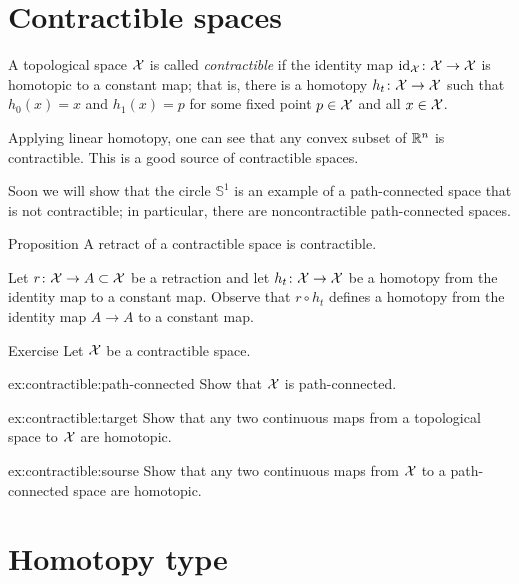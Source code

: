 \section{Contractible spaces}

A topological space $\mathcal{X}$ is called \emph{contractible} if the identity map $\id_\c{X}\:\c{X}\z\to \c{X}$ is homotopic to a constant map;
that is, there is a homotopy $h_t\colon\mathcal{X}\to\mathcal{X}$ such that $h_0(x)=x$ and $h_1(x)=p$ for some fixed point $p\in\mathcal{X}$ and all $x\in \mathcal{X}$.

Applying linear homotopy, one can see that any convex subset of $\mathbb{R}^n$ is contractible.
This is a good source of contractible spaces.

Soon we will show that the circle $\mathbb{S}^1$ is an example of a path-connected space that is not contractible;
in particular, there are noncontractible path-connected spaces.

\begin{thm}{Proposition}\label{prop:retract-contractible}
A retract of a contractible space is contractible.
\end{thm}

Let $r\colon\mathcal{X}\to A\subset \mathcal{X}$ be a retraction
and let $h_t\colon\mathcal{X}\to \mathcal{X}$ be a homotopy from the identity map to a constant map.
Observe that $r\circ h_t$ defines a homotopy from the identity map $A\to A$ to a constant map.
\qeds

\begin{thm}{Exercise}\label{ex:contractible}
Let $\mathcal{X}$ be a contractible space.

\begin{subthm}{ex:contractible:path-connected}
Show that $\mathcal{X}$ is path-connected.
\end{subthm}

\begin{subthm}{ex:contractible:target}
Show that any two continuous maps from a topological space to $\mathcal{X}$ are homotopic.
\end{subthm}

\begin{subthm}{ex:contractible:sourse}
Show that any two continuous maps from $\mathcal{X}$ to a path-connected space are homotopic.
\end{subthm}

\end{thm}



\section{Homotopy type}\label{sec:Homotopy type}

